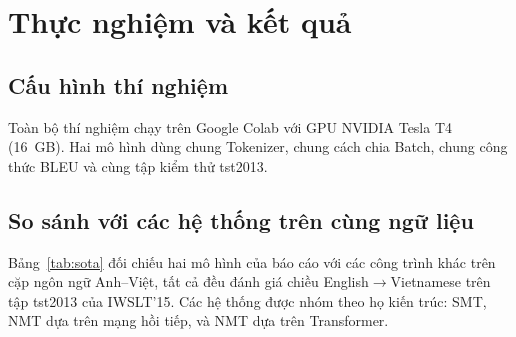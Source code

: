 \documentclass[11pt,a4paper]{article}
\begin{document}
\section{Thực nghiệm và kết quả}
\label{sec:ketqua}

\subsection{Cấu hình thí nghiệm}

Toàn bộ thí nghiệm chạy trên Google Colab với GPU NVIDIA Tesla T4 (16~GB). Hai
mô hình dùng chung Tokenizer, chung cách chia Batch, chung công thức BLEU và
cùng tập kiểm thử tst2013.

\subsection{So sánh với các hệ thống trên cùng ngữ liệu}

Bảng~\ref{tab:sota} đối chiếu hai mô hình của báo cáo với các công trình khác
trên cặp ngôn ngữ Anh--Việt, tất cả đều đánh giá chiều English$\rightarrow$Vietnamese
trên tập tst2013 của IWSLT'15. Các hệ thống được nhóm theo họ kiến trúc: SMT,
NMT dựa trên mạng hồi tiếp, và NMT dựa trên Transformer.
\end{document}
